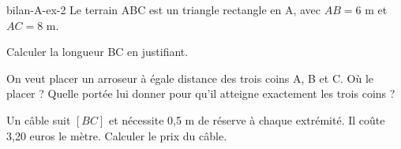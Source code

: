 \begin{blocEdition}{bilan-A-ex-2}
Le terrain ABC est un triangle rectangle en A, avec $AB=6$ m et $AC=8$ m.\begin{questions}
\item Calculer la longueur BC en justifiant.
\item On veut placer un arroseur à égale distance des trois coins A, B et C. Où le placer ? Quelle portée lui donner pour qu’il atteigne exactement les trois coins ?
\item Un câble suit $[BC]$ et nécessite 0,5 m de réserve à chaque extrémité. Il coûte 3,20 euros le mètre. Calculer le prix du câble.
\end{questions}\label{fig-bilan-A-ex-2}
\par{}\par\par{}\par{}\par{}\par{}\par{}\par{}
\end{blocEdition}
